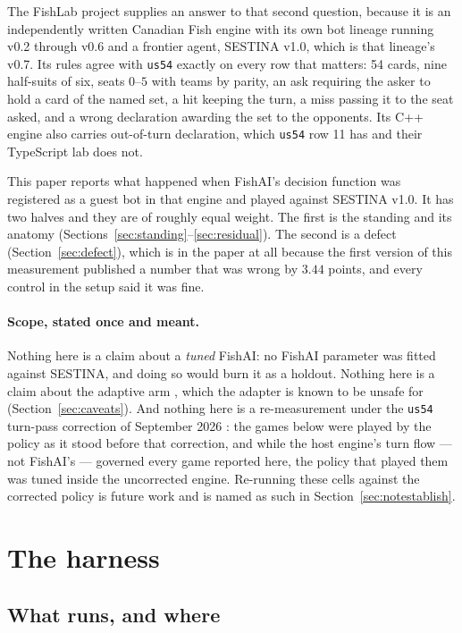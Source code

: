 \documentclass[11pt]{article}
\newcommand{\code}[1]{\texttt{#1}}
\newcommand{\usff}{\code{us54}}
\begin{document}
The FishLab project \cite{fishlab} supplies an answer to that second question, because it is an
independently written Canadian Fish engine with its own bot lineage running v0.2 through v0.6 and a
frontier agent, SESTINA v1.0, which is that lineage's v0.7. Its rules agree with \usff{} exactly on
every row that matters: 54 cards, nine half-suits of six, seats $0$--$5$ with teams by parity, an
ask requiring the asker to hold a card of the named set, a hit keeping the turn, a miss passing it
to the seat asked, and a wrong declaration awarding the set to the opponents. Its C++ engine also
carries out-of-turn declaration, which \usff{} row 11 has and their TypeScript lab does not.

This paper reports what happened when FishAI's decision function was registered as a guest bot in
that engine and played against SESTINA v1.0. It has two halves and they are of roughly equal
weight. The first is the standing and its anatomy (Sections~\ref{sec:standing}--\ref{sec:residual}).
The second is a defect (Section~\ref{sec:defect}), which is in the paper at all because the first
version of this measurement published a number that was wrong by $3.44$ points, and every control
in the setup said it was fine.

\paragraph{Scope, stated once and meant.} Nothing here is a claim about a \emph{tuned} FishAI: no
FishAI parameter was fitted against SESTINA, and doing so would burn it as a holdout. Nothing here
is a claim about the adaptive arm \cite{v10}, which the adapter is known to be unsafe for
(Section~\ref{sec:caveats}). And nothing here is a re-measurement under the \usff{} turn-pass
correction of September 2026 \cite{rules}: the games below were played by the policy as it stood
before that correction, and while the host engine's turn flow --- not FishAI's --- governed every
game reported here, the policy that played them was tuned inside the uncorrected engine. Re-running
these cells against the corrected policy is future work and is named as such in
Section~\ref{sec:notestablish}.

\section{The harness}
\label{sec:harness}

\subsection{What runs, and where}
\end{document}
